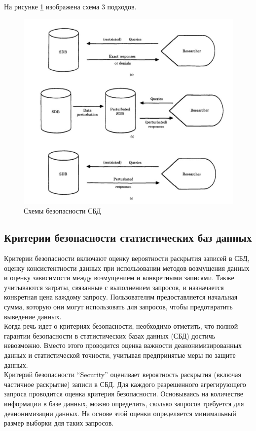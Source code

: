 На рисунке \ref{fig:SDB_secure} изображена схема 3 подходов.
\begin{figure}[h]
\centering
\includegraphics[width=1\linewidth]{assets/text.png}
\caption{Схемы безопасности СБД}
\label{fig:SDB_secure}
\end{figure}


\subsection{Критерии безопасности статистических баз данных}

Критерии безопасности включают оценку вероятности раскрытия записей в СБД, оценку консистентности данных при использовании методов возмущения данных и оценку зависимости между возмущением и конкретными записями. Также учитываются затраты, связанные с выполнением запросов, и назначается конкретная цена каждому запросу. Пользователям предоставляется начальная сумма, которую они могут использовать для запросов, чтобы предотвратить выведение данных.
\\

Когда речь идет о критериях безопасности, необходимо отметить, что полной гарантии безопасности в статистических базах данных (СБД) достичь невозможно. Вместо этого проводится оценка важности деанонимизированных данных и статистической точности, учитывая предпринятые меры по защите данных.
\\

Критерий безопасности \enquote{Security} оценивает вероятность раскрытия (включая частичное раскрытие) записи в СБД. Для каждого разрешенного агрегирующего запроса проводится оценка критерия безопасности. Основываясь на количестве информации в базе данных, можно определить, сколько запросов требуется для деанонимизации данных. На основе этой оценки определяется минимальный размер выборки для таких запросов.
\\

